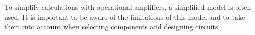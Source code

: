 \begin{frame}
{     %
                

        \begin{Key point}{}      
            To simplify calculations with operational amplifiers, a simplified model is often used. 
            It is important to be aware of the limitations of this model and to take them into account when selecting components and designing circuits.
         \end{Key point}
        }


\end{frame}
